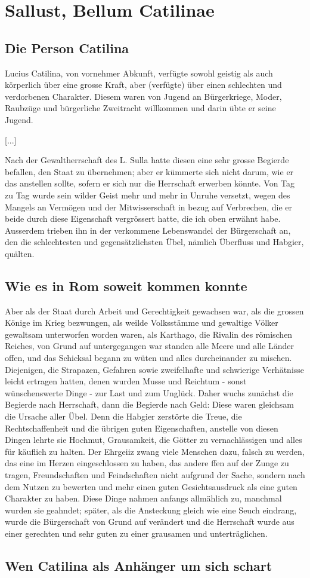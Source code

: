 \documentclass[a4paper]{article}
\begin{document}
\section{Sallust, Bellum Catilinae}

\subsection{Die Person Catilina}

Lucius Catilina, von vornehmer Abkunft, verfügte sowohl geistig als auch körperlich über eine grosse Kraft, aber (verfügte) über einen schlechten und verdorbenen Charakter. Diesem waren von Jugend an Bürgerkriege, Moder, Raubzüge und bürgerliche Zweitracht willkommen und darin übte er seine Jugend.

[...]

Nach der Gewaltherrschaft des L. Sulla hatte diesen eine sehr grosse Begierde befallen, den Staat zu übernehmen; aber er kümmerte sich nicht darum, wie er das anstellen sollte, sofern er sich nur die Herrschaft erwerben könnte. Von Tag zu Tag wurde sein wilder Geist mehr und mehr in Unruhe versetzt, wegen des Mangels an Vermögen und der Mitwisserschaft in bezug auf Verbrechen, die er beide durch diese Eigenschaft vergrössert hatte, die ich oben erwähnt habe. Ausserdem trieben ihn in der verkommene Lebenswandel der Bürgerschaft an, den die schlechtesten und gegensätzlichsten Übel, nämlich Überfluss und Habgier, quälten.

\subsection{Wie es in Rom soweit kommen konnte}

Aber als der Staat durch Arbeit und Gerechtigkeit gewachsen war, als die grossen Könige im Krieg bezwungen, als weilde Volksstämme und gewaltige Völker gewaltsam unterworfen worden waren, als Karthago, die Rivalin des römischen Reiches, von Grund auf untergegangen war standen alle Meere und alle Länder offen, und das Schicksal begann zu wüten und alles durcheinander zu mischen. Diejenigen, die Strapazen, Gefahren sowie zweifelhafte und schwierige Verhätnisse leicht ertragen hatten, denen wurden Musse und Reichtum - sonst wünschenswerte Dinge - zur Last und zum Unglück.
Daher wuchs zunächst die Begierde nach Herrschaft, dann die Begierde nach Geld: Diese waren gleichsam die Ursache aller Übel. Denn die Habgier zerstörte die Treue, die Rechtschaffenheit und die übrigen guten Eigenschaften, anstelle von diesen Dingen lehrte sie Hochmut, Grausamkeit, die Götter zu vernachlässigen und alles für käuflich zu halten. Der Ehrgeiiz zwang viele Menschen dazu, falsch zu werden, das eine im Herzen eingeschlossen zu haben, das andere ffen auf der Zunge zu tragen, Freundschaften und Feindschaften nicht aufgrund der Sache, sondern nach dem Nutzen zu bewerten und mehr einen guten Gesichtsausdruck als eine guten Charakter zu haben. Diese Dinge nahmen anfangs allmählich zu, manchmal wurden sie geahndet; später, als die Ansteckung gleich wie eine Seuch eindrang, wurde die Bürgerschaft von Grund auf verändert und die Herrschaft wurde aus einer gerechten und sehr guten zu einer grausamen und unterträglichen.

\subsection{Wen Catilina als Anhänger um sich schart}
\end{document}
